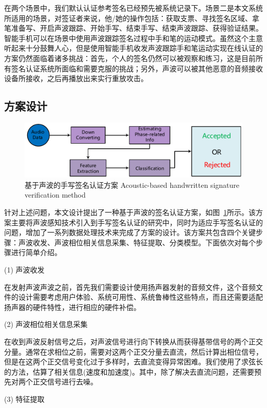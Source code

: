 在两个场景中，我们默认认证参考签名已经预先被系统记录下。场景二是本文系统所适用的场景，对签证者来说，他/她的操作包括：获取支票、寻找签名区域、拿笔准备写、开启声波跟踪、开始手写、结束手写、结束声波跟踪、获得验证结果。智能手机可以在场景中使用声波跟踪签名过程中手和笔的运动模式。虽然这个主意听起来十分鼓舞人心，但是使用智能手机收发声波跟踪手和笔运动实现在线认证的方案仍然面临着诸多挑战：首先，个人的签名仍然可以被观察和练习，这是目前所有签名认证系统所面临和需要克服的挑战；另外，声波可以被其他恶意的音频接收设备所接收，之后再播放出来实行重放攻击。

\subsection{方案设计}
\begin{figure}[!htp]
  \centering
  \includegraphics[width=\textwidth]{figure/system-architecture.pdf}
  \bicaption
    {基于声波的手写签名认证方案}
    {Acoustic-based handwritten signature verification method}
  \label{fig:acoustic-hsv-method}
\end{figure}
针对上述问题，本文设计提出了一种基于声波的签名认证方案，如图~\ref{fig:acoustic-hsv-method}所示。该方案主要将声波感知技术引入到手写签名认证的研究中，同时为适应手写签名认证的问题，增加了一系列数据处理技术来完成了方案的设计。该方案共包含四个关键步骤：声波收发、声波相位相关信息采集、特征提取、分类模型。下面依次对每个步骤进行简单介绍。

(1) 声波收发

在发射声波声波之前，首先我们需要设计使用扬声器发射的音频文件，这个音频文件的设计需要考虑用户体验、系统可用性、系统鲁棒性这些特点，而且还需要适配扬声器的硬件特性，进行相应的硬件补偿。


(2) 声波相位相关信息采集

在收到声波反射信号之后，对声波信号进行向下转换从而获得基带信号的两个正交分量。通常在求相位之前，需要对这两个正交分量去直流，然后计算出相位信号，但是在这两个正交信号变化过于多样时，去直流变得异常困难。我们使用了求弦长的方法，估算了相关信息(速度和加速度)。其中，除了解决去直流问题，还需要预先对两个正交信号进行去噪。


(3) 特征提取

